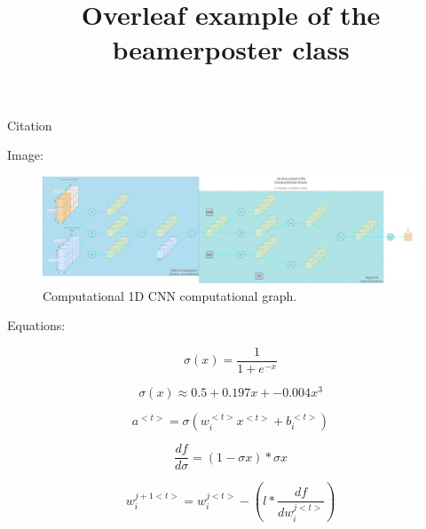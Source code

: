 \documentclass{beamer}
\title[Beamer Poster]{Overleaf example of the beamerposter class}
\begin{document}
  \begin{frame}
    \maketitle

    Citation \autocite{gentry2009fully, Goodfellow-et-al-2016}

    Image:
    \begin{figure}[th!]
      \centering
      \includegraphics[width=\textwidth]{encrypted_cnn.png}
      \caption{Computational 1D CNN computational graph.}
      \label{fig:gan}
    \end{figure}

    Equations:

    \begin{equation}
      \label{sigmoid}
      \sigma(x) = \frac{1}{1+e^{-x}}
    \end{equation}

    \begin{equation}
      \label{sigmoid_approx}
      \sigma(x) \approx 0.5 + 0.197x + -0.004x^3
    \end{equation}

    \begin{equation}
      \label{cnn_activation}
      a^{<t>}=\sigma(w_{i}^{<t>}x^{<t>}+b_i^{<t>})
    \end{equation}

    \begin{equation}
      \label{gradient}
      \frac{df}{d\sigma} = (1-\sigma{x}) * \sigma{x}
    \end{equation}

    \begin{equation}
      \label{weight_update}
      w_i^{j+1<t>} = w_i^{j<t>} - (l * \frac{df}{dw_i^{j<t>}})
    \end{equation}

    \printbibliography

  \end{frame}
\end{document}
